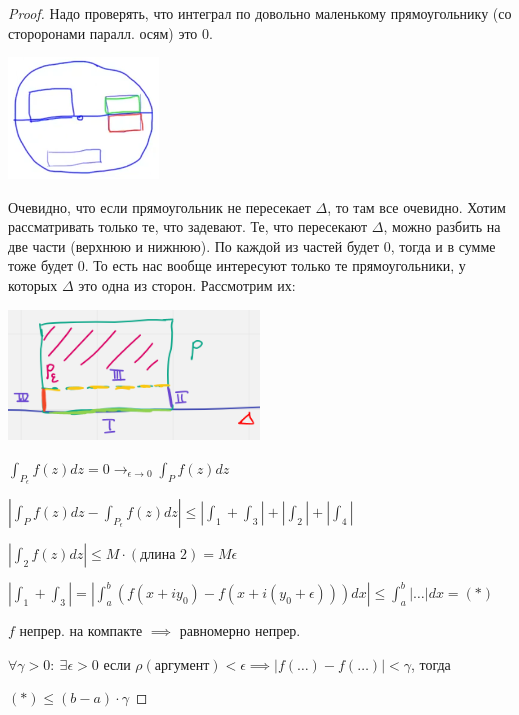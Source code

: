 \begin{proof}
    Надо проверять, что интеграл по довольно маленькому прямоугольнику (со стороронами паралл. осям) это 0.

    \begin{center}
        \includegraphics*[width=0.3\textwidth]{assets/04-functions-of-complex-variables/interesting-rectangles-locally-exact-form-without-line.png}
    \end{center}

    Очевидно, что если прямоугольник не пересекает $\Delta$, то там все очевидно. Хотим рассматривать только те, что задевают. Те, что пересекают $\Delta$, можно разбить на две части (верхнюю и нижнюю). По каждой из частей будет 0, тогда и в сумме тоже будет 0. То есть нас вообще интересуют только те прямоугольники, у которых $\Delta$ это одна из сторон. Рассмотрим их:

    \begin{center}
        \includegraphics*[width=0.5\textwidth]{assets/04-functions-of-complex-variables/smaller-rectangle-locally-exact-form-without-line.png}
    \end{center}

    $\int_{P_{\epsilon}} { f(z) d z } = 0 \rightarrow_{\epsilon \rightarrow 0} \int_{P} { f(z) dz }$

    $\left|\int_{P} {f(z) dz} - \int_{P_{\epsilon}} { f(z) dz } \right| \leq |\int_{1} + \int_{3}| + |\int_{2}| + |\int_{4}|$

    $\left| \int_{2} {f(z) dz} \right| \leq M \cdot (\text{длина } 2) = M \epsilon$

    $\left| \int_{1} + \int_{3} \right| = \left| \int_{a}^{b} { \left(f (x + i y_0) - f(x + i(y_0 + \epsilon)) \right) dx } \right| \leq \int_{a}^{b} { |\dots| dx } = (*)$

    $f$ непрер. на компакте $\implies$ равномерно непрер.

    $\forall \gamma > 0: \ \exists \epsilon > 0$ если $\rho (\text{аргумент}) < \epsilon \implies |f(\dots) - f(\dots)| < \gamma$, тогда

    $(*) \leq (b - a) \cdot \gamma$
\end{proof}

